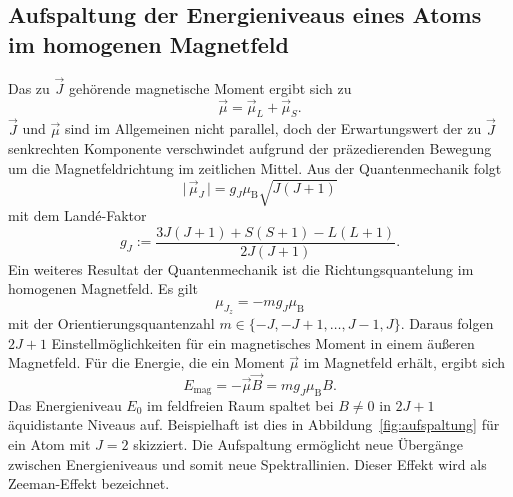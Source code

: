 \subsection{Aufspaltung der Energieniveaus eines Atoms im homogenen Magnetfeld}
%
Das zu $\vec{J}$ gehörende magnetische Moment ergibt sich zu
%
\begin{equation}
    \vec{\mu}=\vec{\mu}_L+\vec{\mu}_S.
\end{equation}
%
$\vec{J}$ und $\vec{\mu}$ sind im Allgemeinen nicht parallel, doch der Erwartungswert der zu $\vec{J}$ senkrechten Komponente verschwindet aufgrund der präzedierenden Bewegung um die Magnetfeldrichtung im zeitlichen Mittel.
Aus der Quantenmechanik folgt
%
\begin{equation}
     \lvert\,\vec{\mu}_J\,\rvert=g_J\mu_{\mathup{B}}\sqrt{J(J+1)}
\end{equation}
%
mit dem Landé-Faktor
%
\begin{equation}
    g_J:=\frac{3J(J+1)+S(S+1)-L(L+1)}{2J(J+1)}.
    \label{eq:g_J}
\end{equation}
%
Ein weiteres Resultat der Quantenmechanik ist die Richtungsquantelung im homogenen Magnetfeld.
Es gilt
%
\begin{equation}
    \mu_{J_z}=-mg_J\mu_{\mathup{B}}
\end{equation}
%
mit der Orientierungsquantenzahl $m\in\{-J,-J+1,\ldots,J-1,J\}$.
Daraus folgen $2J+1$ Einstellmöglichkeiten für ein magnetisches Moment in einem äußeren Magnetfeld.
Für die Energie, die ein Moment $\vec{\mu}$ im Magnetfeld erhält, ergibt sich
%
\begin{equation}
    E_{\mathup{mag}}=-\vec{\mu}\vec{B}=mg_J\mu_{\mathup{B}}B.
    \label{eq:E_mag}
\end{equation}
%
Das Energieniveau $E_0$ im feldfreien Raum spaltet bei $B\neq0$ in $2J+1$ äquidistante Niveaus auf.
Beispielhaft ist dies in Abbildung~\ref{fig:aufspaltung} für ein Atom mit $J=2$ skizziert.
Die Aufspaltung ermöglicht neue Übergänge zwischen Energieniveaus und somit neue Spektrallinien.
Dieser Effekt wird als Zeeman-Effekt bezeichnet.
%

